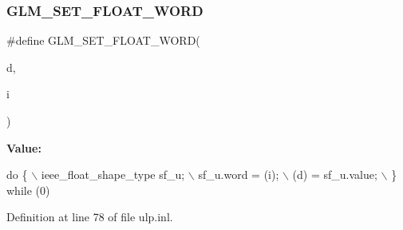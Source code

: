 \subsubsection{\texorpdfstring{G\+L\+M\+\_\+\+S\+E\+T\+\_\+\+F\+L\+O\+A\+T\+\_\+\+W\+O\+RD}{GLM\_SET\_FLOAT\_WORD}}
{\footnotesize\ttfamily \#define G\+L\+M\+\_\+\+S\+E\+T\+\_\+\+F\+L\+O\+A\+T\+\_\+\+W\+O\+RD(\begin{DoxyParamCaption}\item[{}]{d,  }\item[{}]{i }\end{DoxyParamCaption})}

{\bfseries Value\+:}
\begin{DoxyCode}
\textcolor{keywordflow}{do} \{                                    \(\backslash\)
        ieee\_float\_shape\_type sf\_u;         \(\backslash\)
        sf\_u.word = (i);                    \(\backslash\)
        (d) = sf\_u.value;                   \(\backslash\)
    \} \textcolor{keywordflow}{while} (0)
\end{DoxyCode}


Definition at line 78 of file ulp.\+inl.

